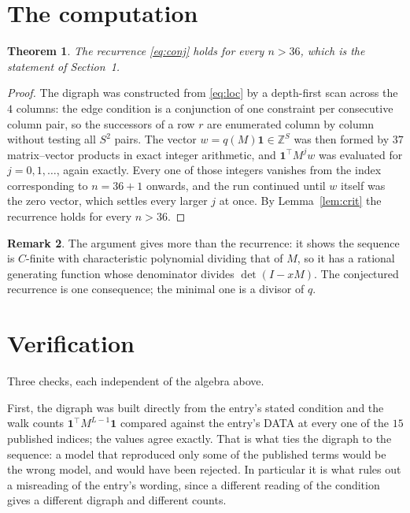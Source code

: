 \documentclass[11pt,a4paper]{article}
\theoremstyle{plain}
\newtheorem{theorem}{Theorem}
\theoremstyle{definition}
\newtheorem{remark}[theorem]{Remark}
\begin{document}
\section{The computation}

\begin{theorem}
The recurrence \eqref{eq:conj} holds for every $n>36$, which is the statement of
Section~1.
\end{theorem}

\begin{proof}
The digraph was constructed from \eqref{eq:loc} by a depth-first scan across the $4$
columns: the edge condition is a conjunction of one constraint per consecutive column
pair, so the successors of a row $r$ are enumerated column by column without testing all
$S^2$ pairs. The vector $w=q(M)\mathbf{1}\in\mathbb{Z}^{S}$ was then formed by $37$
matrix--vector products in exact integer arithmetic, and $\mathbf{1}^{\!\top}M^{j}w$ was
evaluated for $j=0,1,\dots$, again exactly. Every one of those integers vanishes from the
index corresponding to $n=36+1$ onwards, and the run continued until $w$ itself was the
zero vector, which settles every larger $j$ at once. By Lemma~\ref{lem:crit} the recurrence
holds for every $n>36$.
\end{proof}

\begin{remark}
The argument gives more than the recurrence: it shows the sequence is $C$-finite with
characteristic polynomial dividing that of $M$, so it has a rational generating function
whose denominator divides $\det(I-xM)$. The conjectured recurrence is one consequence; the
minimal one is a divisor of $q$.
\end{remark}

\section{Verification}

Three checks, each independent of the algebra above.

First, the digraph was built directly from the entry's stated condition and the walk counts
$\mathbf{1}^{\!\top}M^{L-1}\mathbf{1}$ compared against the entry's DATA at
every one of the $15$ published indices; the values agree exactly. That is what ties
the digraph to the sequence: a model that reproduced only some of the published terms would
be the wrong model, and would have been rejected. In particular it is what rules out a
misreading of the entry's wording, since a different reading of the condition gives a
different digraph and different counts.
\end{document}
